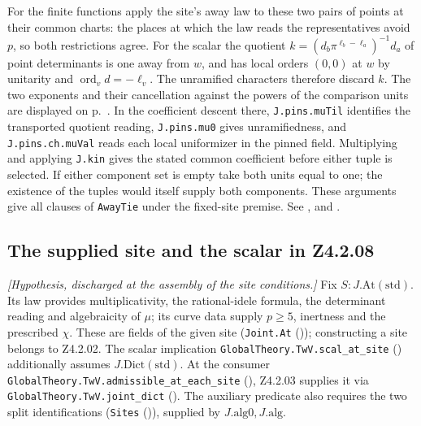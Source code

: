 For the finite functions apply the site's away law to these two pairs
of points at their common charts: the places at which the law reads
the representatives avoid \(p\), so both restrictions agree. For the
scalar the quotient \(k=(d_b\pi^{\ell_b-\ell_a})^{-1}d_a\) of point
determinants is one away from \(w\), and has local orders \((0,0)\) at
\(w\) by unitarity and \(\operatorname{ord}_v d=-\ell_v\).
The unramified characters therefore discard \(k\). The two exponents
and their cancellation against the powers of the comparison units are
displayed on p.~\pageref{r7:Z4.2.07}. In the coefficient descent there,
\nolinkurl{J.pins.muTil} identifies the transported quotient reading,
\nolinkurl{J.pins.mu0} gives unramifiedness, and
\nolinkurl{J.pins.ch.muVal} reads each local uniformizer in the pinned
field. Multiplying and applying \nolinkurl{J.kin} gives the stated
common coefficient before either tuple is selected. If either component
set is empty take both units equal to one; the existence of the tuples
would itself supply both components. These arguments give all clauses of
\nolinkurl{AwayTie} under the fixed-site premise.
See ,
 and
.

\subsection{The supplied site and the scalar in Z4.2.08}\label{r7:review:Z4.2.08}
\emph{[Hypothesis, discharged at the assembly of the site conditions.]} Fix $S:J.\mathrm{At}(\mathrm{std})$. Its law provides multiplicativity, the rational-idele formula, the determinant reading and algebraicity of $\mu$; its curve data supply $p\ge5$, inertness and the prescribed $\chi$. These are fields of the given site (\nolinkurl{Joint.At} ()); constructing a site belongs to Z4.2.02. The scalar implication \nolinkurl{GlobalTheory.TwV.scal_at_site} () additionally assumes $J.\mathrm{Dict}(\mathrm{std})$. At the consumer \nolinkurl{GlobalTheory.TwV.admissible_at_each_site} (), Z4.2.03 supplies it via \nolinkurl{GlobalTheory.TwV.joint_dict} (). The auxiliary predicate also requires the two split identifications (\nolinkurl{Sites} ()), supplied by $J.\mathrm{alg0},J.\mathrm{alg}$.

